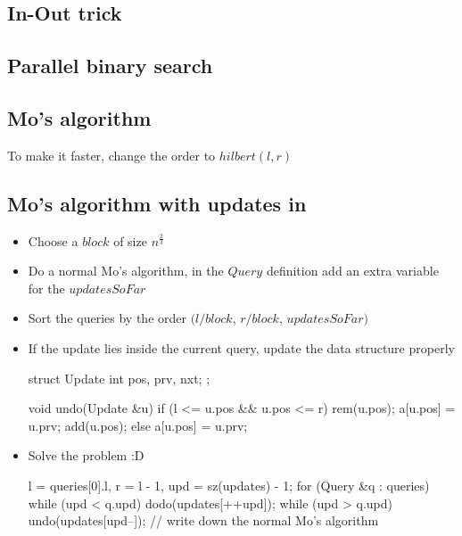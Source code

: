 \subsection{In-Out trick}

\subsection{Parallel binary search}

\subsection{Mo's algorithm}
To make it faster, change the order to $hilbert(l, r)$ \\

\subsection*{Mo's algorithm with updates in  }
  
\begin{itemize}[noitemsep]
  \item Choose a $block$ of size $n^{\frac{2}{3}}$
  \item Do a normal Mo's algorithm, in the $Query$ definition add an extra variable for the $updatesSoFar$ 
  \item Sort the queries by the order $(l /block$, $r / block$, $updatesSoFar)$
  \item If the update lies inside the current query, update the data structure properly \\
  \begin{code}
   struct Update {
     int pos, prv, nxt;
   };
  
   void undo(Update &u) {
     if (l <= u.pos && u.pos <= r) {
       rem(u.pos);
       a[u.pos] = u.prv;
       add(u.pos);
     } else {
       a[u.pos] = u.prv;
     }
   }
  \end{code}
    
  \item Solve the problem :D \\
  \begin{code}
   l = queries[0].l, r = l - 1, upd = sz(updates) - 1;
   for (Query &q : queries) {
     while (upd < q.upd)
       dodo(updates[++upd]);
     while (upd > q.upd)
       undo(updates[upd--]);
     // write down the normal Mo's algorithm
   }
  \end{code}
\end{itemize}
\vspace{-15pt}

